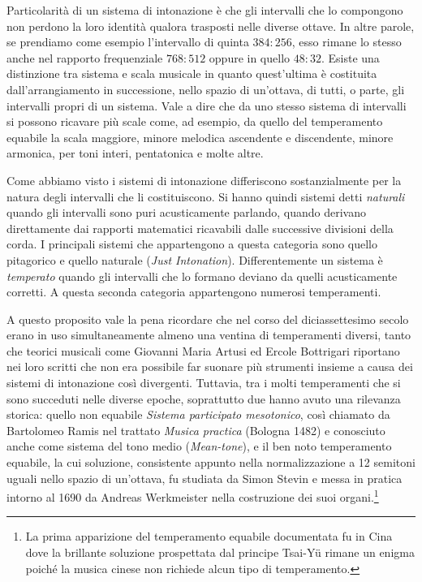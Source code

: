 Particolarità di un sistema di intonazione è che gli intervalli che lo
compongono non perdono la loro identità qualora trasposti nelle diverse ottave.
In altre parole, se prendiamo come esempio l'intervallo di quinta $384:256$,
esso rimane lo stesso anche nel rapporto frequenziale $768:512$ oppure in quello
$48:32$. Esiste una distinzione tra sistema e scala musicale in quanto
quest'ultima è costituita dall'arrangiamento in successione, nello spazio di
un'ottava, di tutti, o parte, gli intervalli propri di un sistema. Vale a dire
che da uno stesso sistema di intervalli si possono ricavare più scale come, ad
esempio, da quello del temperamento equabile la scala maggiore, minore melodica
ascendente e discendente, minore armonica, per toni interi, pentatonica e molte
altre.

Come abbiamo visto i sistemi di intonazione differiscono sostanzialmente per la
natura degli intervalli che li costituiscono. Si hanno quindi sistemi detti
\emph{naturali} quando gli intervalli sono puri acusticamente parlando, quando
derivano direttamente dai rapporti matematici ricavabili dalle successive
divisioni della corda. I principali sistemi che appartengono a questa categoria
sono quello pitagorico e quello naturale (\emph{Just Intonation}).
Differentemente un sistema è \emph{temperato} quando gli intervalli che lo
formano deviano da quelli acusticamente corretti. A questa seconda categoria
appartengono numerosi temperamenti.

A questo proposito vale la pena ricordare che nel corso del diciassettesimo
secolo erano in uso simultaneamente almeno una ventina di temperamenti diversi,
tanto che teorici musicali come Giovanni Maria Artusi ed Ercole Bottrigari
riportano nei loro scritti che non era possibile far suonare più strumenti
insieme a causa dei sistemi di intonazione così divergenti. Tuttavia, tra i
molti temperamenti che si sono succeduti nelle diverse epoche, soprattutto due
hanno avuto una rilevanza storica: quello non equabile \emph{Sistema participato
mesotonico}, così chiamato da Bartolomeo Ramis nel trattato \emph{Musica
practica} (Bologna 1482) e conosciuto anche come sistema del tono medio
(\emph{Mean-tone}), e il ben noto temperamento equabile, la cui soluzione,
consistente appunto nella normalizzazione a 12 semitoni uguali nello spazio di
un'ottava, fu studiata da Simon Stevin e messa in pratica intorno al 1690 da
Andreas Werkmeister nella costruzione dei suoi organi.\footnote{La prima
apparizione del temperamento equabile documentata fu in Cina dove la brillante
soluzione prospettata dal principe Tsai-Yü rimane un enigma poiché la musica
cinese non richiede alcun tipo di temperamento.}

